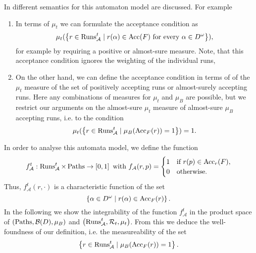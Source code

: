 In \cite{RandAutoInfTrees} different semantics for this automaton model are
discussed. For example
\begin{enumerate}
  \item In terms of $\mu_{t}$ we can formulate the acceptance condition as
    \begin{equation*}
      \mu_{t}(
        \left\{
          r\in\operatorname{Runs}_{\mathcal{A}}^{t}\mid
            r(\alpha)\in\operatorname{Acc}(F)\text{ for every }\alpha\in D^{\omega}
        \right\}
      ),
    \end{equation*}
    for example by requiring a positive or almost-sure measure. Note, that this
    acceptance condition ignores the weighting of the individual runs,
  \item On the other hand, we can define the acceptance condition in terms of
    of the $\mu_{t}$ measure of the set of positively accepting runs or 
    almost-surely accepting runs. Here any combinations of measures for 
    $\mu_{t}$ and $\mu_{B}$ are possible, but we restrict our arguments on the 
    almost-sure $\mu_{t}$ measure of almost-sure $\mu_{B}$ accepting runs, i.e.
    to the condition
    \begin{equation*}
      \mu_{t}(
        \left\{
          r\in\operatorname{Runs}_{\mathcal{A}}^{t}\mid
            \mu_{B}(\operatorname{Acc}_{F}(r)) = 1
        \right\}
      ) = 1.
    \end{equation*}
\end{enumerate}
In order to analyse this automata model, we define the function
\begin{equation*}
  f_{\mathcal{A}}^{t}:\operatorname{Runs}_{\mathcal{A}}^{t}\times\operatorname{Paths}\rightarrow
    \left[0,1\right]
  \text{ with }
  f_{\mathcal{A}}(r, p) = \begin{cases}
    1&\text{if }r(p)\in\operatorname{Acc}_{r}(F),\\
    0&\text{otherwise.}
  \end{cases}
\end{equation*}
Thus, $f_{\mathcal{A}}^{t}(r,\cdot)$ is a characteristic function of the set
\begin{equation*}
  \left\{\alpha\in D^{\omega}\mid r(\alpha)\in\operatorname{Acc}_{F}(r)\right\}.
\end{equation*}
In the following we show the integrability of the function 
$f_{\mathcal{A}}^{t}$ in the product space of 
$\left(\operatorname{Paths}, \mathcal{B}(D), \mu_{B}\right)$ and 
$\left(\operatorname{Runs}_{\mathcal{A}}^{t}, \mathcal{R}_{t}, \mu_{t}\right)$. From this we
deduce the well-foundness of our definition, i.e. the measureability of the set
\begin{equation*}
  \left\{
    r\in\operatorname{Runs}_{\mathcal{A}}^{t}\mid
      \mu_{B}(\operatorname{Acc}_{F}(r)) = 1
  \right\}.
\end{equation*}

